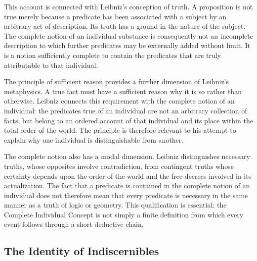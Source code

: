 \label{para:VS.B01.P01.C08.S07.SS03.P003}

This account is connected with Leibniz's conception
of truth. A proposition is not true merely because
a predicate has been associated with a subject by
an arbitrary act of description. Its truth has a
ground in the nature of the subject. The complete
notion of an individual substance is consequently
not an incomplete description to which further
predicates may be externally added without limit.
It is a notion sufficiently complete to contain
the predicates that are truly attributable to
that individual. \cite[§8]{LeibnizDiscourse}

\label{para:VS.B01.P01.C08.S07.SS03.P004}

The principle of sufficient reason provides a further
dimension of Leibniz's metaphysics. A true fact must
have a sufficient reason why it is so rather than
otherwise. Leibniz connects this requirement with
the complete notion of an individual: the predicates
true of an individual are not an arbitrary collection
of facts, but belong to an ordered account of that
individual and its place within the total order of
the world. The principle is therefore relevant to
his attempt to explain why one individual is
distinguishable from another. \cite{LookLeibnizSEP2020}
\cite[§§8--9]{LeibnizDiscourse}

\label{para:VS.B01.P01.C08.S07.SS03.P005}

The complete notion also has a modal dimension.
Leibniz distinguishes necessary truths, whose
opposites involve contradiction, from contingent
truths whose certainty depends upon the order of
the world and the free decrees involved in its
actualization. The fact that a predicate is contained
in the complete notion of an individual does not
therefore mean that every predicate is necessary
in the same manner as a truth of logic or geometry.
This qualification is essential: the Complete
Individual Concept is not simply a finite definition
from which every event follows through a short
deductive chain. \cite[§13]{LeibnizDiscourse}



\subsection{The Identity of Indiscernibles}
\label{subsec:ch08-leibniz-identity-indiscernibles}

